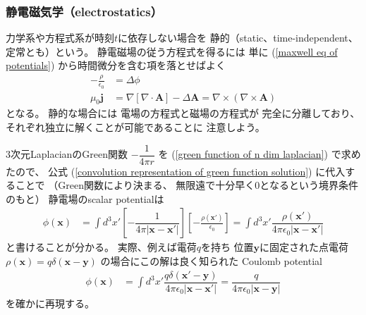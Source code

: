 \subsubsection{静電磁気学（electrostatics）}

力学系や方程式系が時刻$t$に依存しない場合を
静的（static、time-independent、定常とも）という。
静電磁場の従う方程式を得るには
単に
(\ref{maxwell eq of potentials})
から時間微分を含む項を落とせばよく
\begin{subequations}
\begin{align}
  - \frac{\rho}{\epsilon_0}
&=
  \Delta \phi
\label{static eq for ele-mag scalar potential}
\\
  \mu_0 \bm{j}
&=
  \nabla
  \left[
    \nabla \cdot
      \bm{A}
  \right]
  -
    \Delta
    \bm{A}
=
  \nabla \times
    (\nabla \times \bm{A})
\label{static eq for ele-mag vector potential}
\end{align}
\end{subequations}
となる。
静的な場合には
電場の方程式と磁場の方程式が
完全に分離しており、
それぞれ独立に解くことが可能であることに
注意しよう。

$3$次元LaplacianのGreen関数
$ - \dfrac{1}{4 \pi r} $
を
(\ref{green function of n dim laplacian})
で求めたので、
公式
(\ref{convolution representation of green function solution})
に代入することで
（Green関数により決まる、
無限遠で十分早く$0$となるという境界条件のもと）
静電場のscalar potentialは
\begin{align}
  \phi (\bm{x})
&=
  \int d^3 x'
  \left[
    - \dfrac{1}{
      4 \pi |\bm{x} - \bm{x}'|
    }
  \right]
  \left[
    - \frac{\rho(\bm{x}')}{\epsilon_0}
  \right]
=
  \int d^3 x'
    \dfrac{\rho(\bm{x}')}{
      4 \pi \epsilon_0
      |\bm{x} - \bm{x}'|
    }
\end{align}
と書けることが分かる。
実際、例えば電荷$q$を持ち
位置$\bm{y}$に固定された点電荷
$\rho(\bm{x})
= q \delta(\bm{x} - \bm{y})$
の場合にこの解は良く知られた
Coulomb potential
\begin{align}
  \phi (\bm{x})
&=
  \int d^3 x'
    \dfrac{
      q \delta(\bm{x}' - \bm{y})
    }{
      4 \pi \epsilon_0
      |\bm{x} - \bm{x}'|
    }
=
    \dfrac{ q }{
      4 \pi \epsilon_0
      |\bm{x} - \bm{y}|
    }
\label{coulomb potential of point charge}
\end{align}
を確かに再現する。

